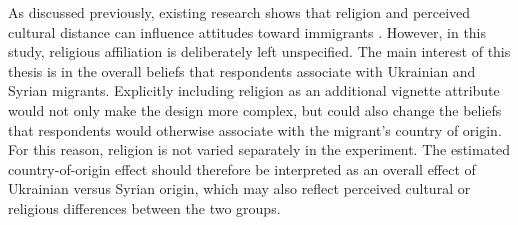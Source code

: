 As discussed previously, existing research shows that religion and perceived cultural distance can influence attitudes 
toward immigrants \citep[e.g.,][]{czymara2016deutschland}. However, in this study, religious affiliation is 
deliberately left unspecified. The main interest of this thesis is in the overall beliefs that respondents associate 
with Ukrainian and Syrian migrants. Explicitly including religion as an additional vignette attribute would not only 
make the design more complex, but could also change the beliefs that respondents would otherwise associate with the 
migrant's country of origin. For this reason, religion is not varied separately in the experiment. The estimated 
country-of-origin effect should therefore be interpreted as an overall effect of Ukrainian versus Syrian origin, 
which may also reflect perceived cultural or religious differences between the two groups.

